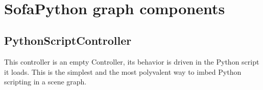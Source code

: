 \
\section{SofaPython graph components}

\subsection{PythonScriptController}
This controller is an empty Controller, its behavior is driven in the Python script it loads. This is the simplest and the most polyvalent way to imbed Python scripting in a \sofa scene graph. 

   
